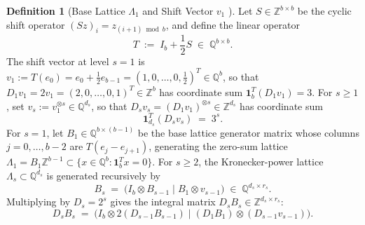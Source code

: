 \documentclass[11pt,a4paper]{article}
\theoremstyle{plain}
\theoremstyle{definition}
\newtheorem{definition}[theorem]{Definition}
\newcommand{\Z}{\mathbb{Z}}
\newcommand{\Q}{\mathbb{Q}}
\begin{document}
\begin{definition}[Base Lattice $\Lambda_1$ and Shift Vector $v_1$ \cite{Toledo26}]\label{def:base-lattice}
Let $S \in \Z^{b \times b}$ be the cyclic shift operator $(S z)_i = z_{(i+1) \bmod b}$, and define the linear operator
\[
T \;:=\; I_b + \frac{1}{2} S \;\in\; \Q^{b \times b}.
\]
The shift vector at level $s = 1$ is $v_1 := T(e_0) = e_0 + \frac{1}{2} e_{b-1} = (1, 0, \dots, 0, \frac{1}{2})^T \in \Q^b$, so that $D_1 v_1 = 2 v_1 = (2, 0, \dots, 0, 1)^T \in \Z^b$ has coordinate sum $\mathbf{1}_b^T (D_1 v_1) = 3$. For $s \ge 1$, set $v_s := v_1^{\otimes s} \in \Q^{d_s}$, so that $D_s v_s = (D_1 v_1)^{\otimes s} \in \Z^{d_s}$ has coordinate sum
\[
\mathbf{1}_{d_s}^T (D_s v_s) \;=\; 3^s.
\]
For $s = 1$, let $B_1 \in \Q^{b \times (b-1)}$ be the base lattice generator matrix whose columns $j = 0, \dots, b-2$ are $T(e_j - e_{j+1})$, generating the zero-sum lattice $\Lambda_1 = B_1 \Z^{b-1} \subset \{x \in \Q^b : \mathbf{1}_b^T x = 0\}$. For $s \ge 2$, the Kronecker-power lattice $\Lambda_s \subset \Q^{d_s}$ is generated recursively by
\begin{equation}\label{eq:kronecker-rec}
B_s \;=\; \big( I_b \otimes B_{s-1} \;\big|\; B_1 \otimes v_{s-1} \big) \;\in\; \Q^{d_s \times r_s}.
\end{equation}
Multiplying by $D_s = 2^s$ gives the integral matrix $D_s B_s \in \Z^{d_s \times r_s}$:
\begin{equation}\label{eq:scaled-rec}
D_s B_s \;=\; \big( I_b \otimes 2 (D_{s-1} B_{s-1}) \;\big|\; (D_1 B_1) \otimes (D_{s-1} v_{s-1}) \big).
\end{equation}
\end{definition}
\end{document}
